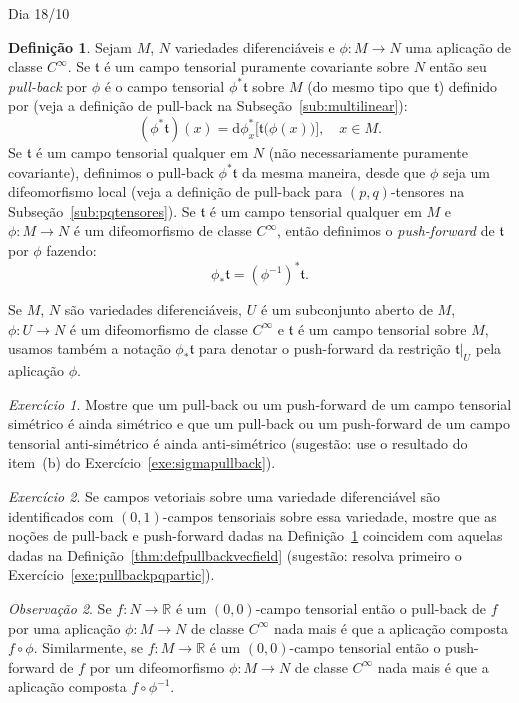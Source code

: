 \documentclass[oneside,11pt]{amsart}
\newcommand{\R}{\mathds R}
\newcommand{\dd}{\mathrm d}
\theoremstyle{remark}\newtheorem{exercise}{Exercício}[section]
\theoremstyle{plain}\newtheorem{teo}{Teorema}[section]
\theoremstyle{plain}\newtheorem{lem}[teo]{Lema}
\theoremstyle{plain}\newtheorem{prop}[teo]{Proposição}
\theoremstyle{definition}\newtheorem{defin}[teo]{Definição}
\theoremstyle{remark}\newtheorem{rem}[teo]{Observação}
\theoremstyle{definition}\newtheorem{example}[teo]{Exemplo}
\numberwithin{equation}{section}
\begin{document}
\begin{section}{Dia 18/10}
\begin{defin}\label{thm:defpullbacktensfield}
Sejam $M$, $N$ variedades diferenciáveis e $\phi:M\to N$ uma aplicação de classe $C^\infty$. Se $\mathfrak t$ é um campo tensorial puramente covariante
sobre $N$ então seu {\em pull-back\/} por $\phi$ é o campo tensorial $\phi^*\mathfrak t$ sobre $M$ (do mesmo tipo que $\mathfrak t$) definido por
(veja a definição de pull-back na Subseção~\ref{sub:multilinear}):
\[(\phi^*\mathfrak t)(x)=\dd\phi_x^*\big[\mathfrak t\big(\phi(x)\big)\big],\quad x\in M.\]
Se $\mathfrak t$ é um campo tensorial qualquer em $N$ (não necessariamente puramente covariante), definimos o pull-back $\phi^*\mathfrak t$
da mesma maneira, desde que $\phi$ seja um difeomorfismo local (veja a definição de pull-back para $(p,q)$-tensores na Subseção~\ref{sub:pqtensores}).
Se $\mathfrak t$ é um campo tensorial qualquer em $M$ e $\phi:M\to N$ é um difeomorfismo
de classe $C^\infty$, então definimos o {\em push-forward\/} de $\mathfrak t$ por $\phi$ fazendo:
\[\phi_*\mathfrak t=(\phi^{-1})^*\mathfrak t.\]
\end{defin}
Se $M$, $N$ são variedades diferenciáveis, $U$ é um subconjunto aberto de $M$, $\phi:U\to N$ é um difeomorfismo de classe $C^\infty$ e $\mathfrak t$ é um campo
tensorial sobre $M$, usamos também a notação $\phi_*\mathfrak t$ para denotar o push-forward da restrição $\mathfrak t\vert_U$ pela aplicação $\phi$.

\begin{exercise}
Mostre que um pull-back ou um push-forward de um campo tensorial simétrico é ainda simétrico e que um pull-back ou um push-forward
de um campo tensorial anti-simétrico é ainda anti-simétrico (sugestão: use o resultado do item~(b) do Exercício~\ref{exe:sigmapullback}).
\end{exercise}

\begin{exercise}
Se campos vetoriais sobre uma variedade diferenciável são identificados com $(0,1)$-campos tensoriais sobre essa variedade, mostre que as noções
de pull-back e push-forward dadas na Definição~\ref{thm:defpullbacktensfield} coincidem com aquelas dadas na Definição~\ref{thm:defpullbackvecfield}
(sugestão: resolva primeiro o Exercício~\ref{exe:pullbackpqpartic}).
\end{exercise}

\begin{rem}\label{thm:obspullback00}
Se $f:N\to\R$ é um $(0,0)$-campo tensorial então o pull-back de $f$ por uma aplicação $\phi:M\to N$ de classe $C^\infty$
nada mais é que a aplicação composta $f\circ\phi$.
Similarmente, se $f:M\to\R$ é um $(0,0)$-campo tensorial então o push-forward de $f$ por um difeomorfismo $\phi:M\to N$ de classe $C^\infty$ nada
mais é que a aplicação composta $f\circ\phi^{-1}$.
\end{rem}


\end{section}
\end{document}
